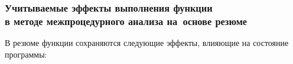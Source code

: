 \documentclass[hyperref={pdfpagelabels=false},10pt,gray]{beamer}
\begin{document}



\begin{frame}
\frametitle{Учитываемые эффекты выполнения функции\\в методе межпроцедурного анализа на~основе резюме}
В резюме функции сохраняются следующие эффекты, влияющие на состояние программы:
\begin{figure}[h]

% 
\end{figure}
\end{frame}
\end{document}

